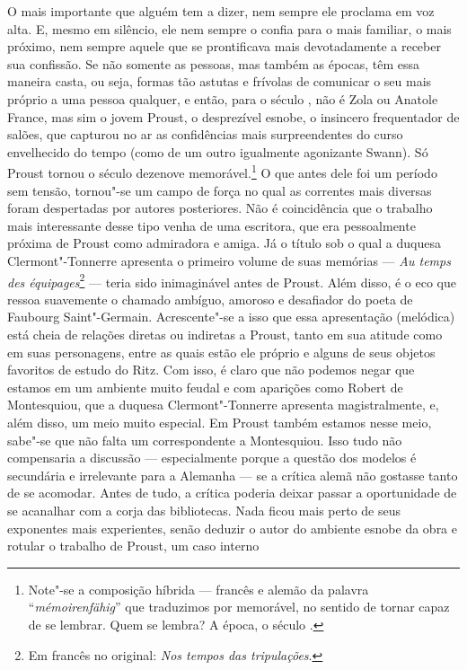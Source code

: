 O mais importante que alguém tem a dizer, nem sempre ele proclama em voz
alta. E, mesmo em silêncio, ele nem sempre o confia para o mais
familiar, o mais próximo, nem sempre aquele que se prontificava mais
devotadamente a receber sua confissão. Se não somente as pessoas, mas
também as épocas, têm essa maneira casta, ou seja, formas tão astutas e
frívolas de comunicar o seu mais próprio a uma pessoa qualquer, e então,
para o século , não é Zola ou Anatole France, mas sim o jovem Proust,
o desprezível esnobe, o insincero frequentador de salões, que capturou
no ar as confidências mais surpreendentes do curso envelhecido do tempo
(como de um outro igualmente agonizante Swann). Só Proust tornou o
século dezenove memorável.\footnote{Note"-se a composição híbrida ---
  francês e alemão da palavra ``\emph{mémoirenfähig}'' que traduzimos
  por memorável, no sentido de tornar capaz de se lembrar. Quem se
  lembra? A época, o século . \versal{[N.~T.]}} O que antes dele foi um período sem
tensão, tornou"-se um campo de força no qual as correntes mais diversas
foram despertadas por autores posteriores. Não é coincidência que o
trabalho mais interessante desse tipo venha de uma escritora, que era
pessoalmente próxima de Proust como admiradora e amiga. Já o título sob
o qual a duquesa Clermont"-Tonnerre apresenta o primeiro volume de suas
memórias --- \emph{Au temps des équipages}\footnote{Em francês no original: \emph{Nos tempos das tripulações}. \versal{[N.~T.]}} --- teria sido inimaginável antes de
Proust. Além disso, é o eco que ressoa suavemente o chamado ambíguo,
amoroso e desafiador do poeta de Faubourg Saint"-Germain. Acrescente"-se a
isso que essa apresentação (melódica) está cheia de relações diretas ou
indiretas a Proust, tanto em sua atitude como em suas personagens, entre
as quais estão ele próprio e alguns de seus objetos favoritos de estudo
do Ritz. Com isso, é claro que não podemos negar que estamos em um
ambiente muito feudal e com aparições como Robert de Montesquiou, que a
duquesa Clermont"-Tonnerre apresenta magistralmente, e, além disso, um
meio muito especial. Em Proust também estamos nesse meio, sabe"-se que
não falta um correspondente a Montesquiou. Isso tudo não compensaria a
discussão --- especialmente porque a questão dos modelos é secundária e
irrelevante para a Alemanha --- se a crítica alemã não gostasse tanto de
se acomodar. Antes de tudo, a crítica poderia deixar passar a
oportunidade de se acanalhar com a corja das bibliotecas. Nada ficou
mais perto de seus exponentes mais experientes, senão deduzir o autor do
ambiente esnobe da obra e rotular o trabalho de Proust, um caso interno
